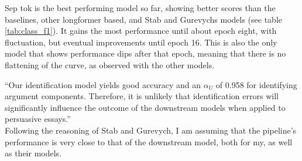 \documentclass[12]{article}
\theoremstyle{mytheoremstyle}
\theoremstyle{mytheoremstyle}
\theoremstyle{myproblemstyle}
\begin{document}
  Sep tok is the best performing model so far, showing better scores than the baselines, other longformer based, and Stab and Gurevychs models (see table \ref{tab:class_f1}). 
  It gains the most performance until about epoch eight, with fluctuation, but eventual improvements until epoch 16. 
  This is also the only model that shows performance dips after that epoch, meaning that there is no flattening of the curve, as observed with the other models.

  ``Our identification model yields good accuracy and an $\alpha_U$ of 0.958 for identifying argument components. 
  Therefore, it is unlikely that identification errors will significantly influence the outcome of the downstream models when applied to persuasive essays.'' \cite{stab-gurevych-2017-parsing}\\
  Following the reasoning of Stab and Gurevych, I am assuming that the pipeline's performance is very close to that of the downstream model, both for my, as well as their models.
\end{document}
